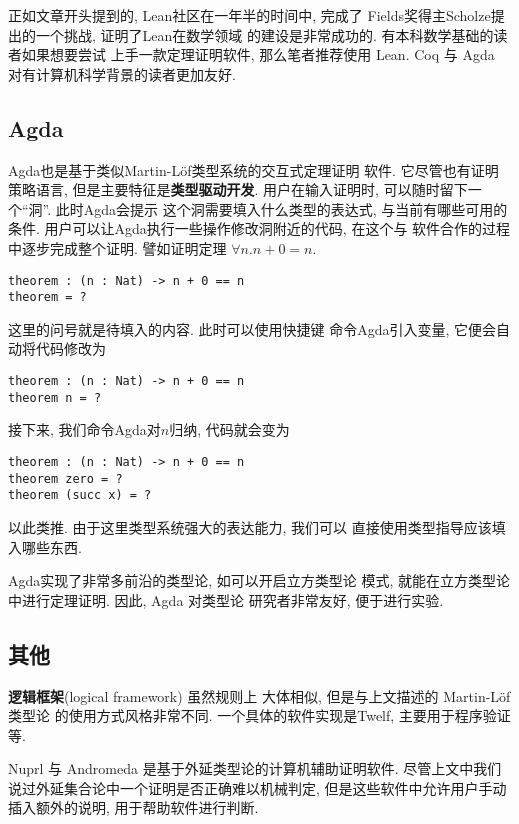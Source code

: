 正如文章开头提到的, Lean社区在一年半的时间中, 完成了
Fields奖得主Scholze提出的一个挑战, 证明了Lean在数学领域
的建设是非常成功的. 有本科数学基础的读者如果想要尝试
上手一款定理证明软件, 那么笔者推荐使用 Lean. Coq 与 Agda
对有计算机科学背景的读者更加友好.

\subsection{Agda}

Agda也是基于类似Martin-L\"of类型系统的交互式定理证明
软件. 它尽管也有证明策略语言, 但是主要特征是\textbf{类型驱动开发}.
用户在输入证明时, 可以随时留下一个“洞”. 此时Agda会提示
这个洞需要填入什么类型的表达式, 与当前有哪些可用的条件.
用户可以让Agda执行一些操作修改洞附近的代码, 在这个与
软件合作的过程中逐步完成整个证明. 譬如证明定理
\(\forall n. n + 0 = n\).
\begin{verbatim}
theorem : (n : Nat) -> n + 0 == n
theorem = ?
\end{verbatim}
这里的问号就是待填入的内容. 此时可以使用快捷键
命令Agda引入变量, 它便会自动将代码修改为
\begin{verbatim}
theorem : (n : Nat) -> n + 0 == n
theorem n = ?
\end{verbatim}
接下来, 我们命令Agda对\(n\)归纳, 代码就会变为
\begin{verbatim}
theorem : (n : Nat) -> n + 0 == n
theorem zero = ?
theorem (succ x) = ?
\end{verbatim}
以此类推. 由于这里类型系统强大的表达能力, 我们可以
直接使用类型指导应该填入哪些东西.

Agda实现了非常多前沿的类型论, 如可以开启立方类型论
模式, 就能在立方类型论中进行定理证明. 因此, Agda 对类型论
研究者非常友好, 便于进行实验.

\subsection{其他}

\textbf{逻辑框架}(logical framework) 虽然规则上
大体相似, 但是与上文描述的 Martin-L\"of 类型论
的使用方式风格非常不同. 一个具体的软件实现是Twelf,
主要用于程序验证等.

Nuprl 与 Andromeda 是基于外延类型论的计算机辅助证明软件.
尽管上文中我们说过外延集合论中一个证明是否正确难以机械判定,
但是这些软件中允许用户手动插入额外的说明, 用于帮助软件进行判断.

